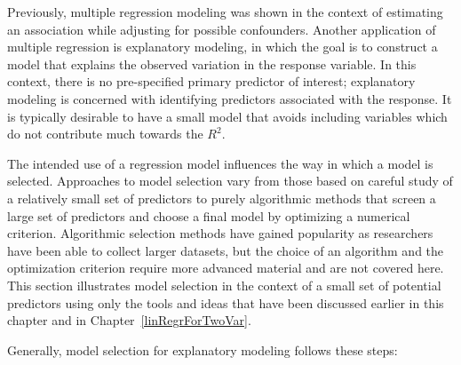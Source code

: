 Previously, multiple regression modeling was shown in the context of estimating an association while adjusting for possible confounders. Another application of multiple regression is explanatory modeling, in which the goal is to construct a model that explains the observed variation in the response variable. In this context, there is no pre-specified primary predictor of interest; explanatory modeling is concerned with identifying predictors associated with the response. It is typically desirable to have a small model that avoids including variables which do not contribute much towards the $R^2$.


The intended use of a regression model influences the way in which a model is selected. Approaches to model selection vary from those based on careful study of a relatively small set of predictors to purely algorithmic methods that screen a large set of predictors and choose a final model by optimizing a numerical criterion. Algorithmic selection methods have gained popularity as researchers have been able to collect larger datasets, but the choice of an algorithm and the optimization criterion require more advanced material and are not covered here. This section illustrates model selection in the context of a small set of potential predictors using only the tools and ideas that have been discussed earlier in this chapter and in Chapter~\ref{linRegrForTwoVar}. 

Generally, model selection for explanatory modeling follows these steps:


